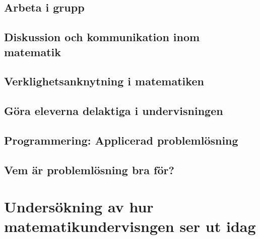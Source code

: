 \documentclass[11pt,a4paper]{article}
\begin{document}
    \subsection{Arbeta i grupp}
        \label{sec:Arbetaigrupp}
        
        
    \subsection{Diskussion och kommunikation inom matematik}
        
        \label{sec:Diskussion}
        
    \subsection{Verklighetsanknytning i matematiken}
        \label{sec:Verklighetsanknytning}
        
        
    \subsection{Göra eleverna delaktiga i undervisningen}
        
        \label{sec:delaktighet}
        
    \subsection{Programmering: Applicerad problemlösning}
        \label{sec:ProgrammeringOchMatematik}
        
        
    \subsection{Vem är problemlösning bra för?}
        
    
\section{Undersökning av hur matematikundervisngen ser ut idag}
    
    
\end{document}
